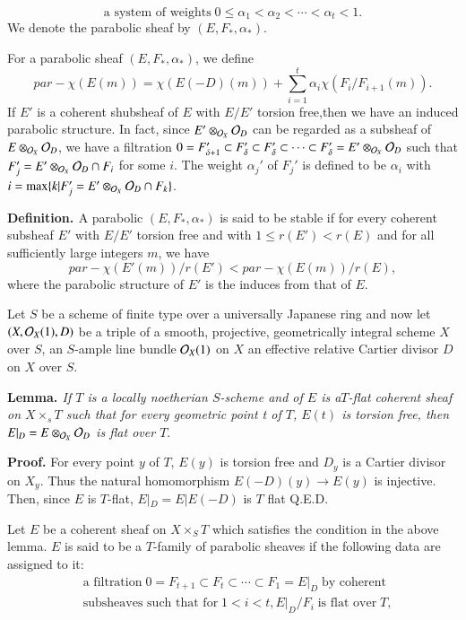 \begin{equation}
\text{a system of weights} \; 0 \leq \alpha_{1} < \alpha_{2} < \cdots < \alpha_{t} < 1.\tag{2.1.2}\label{art12-eq-2.1.2}
\end{equation}
We denote the parabolic sheaf by $(E, F_{*}, \alpha_{*})$.

For a parabolic sheaf $(E, F_{*}, \alpha_{*})$, we define
$$
par-\chi(E(m))= \chi(E(-D)(m)) + \sum\limits_{i=1}^{t} \alpha_{i}\chi(F_{i}/F_{i+1}(m)).
$$ 
If $E'$ is a coherent shubsheaf of $E$ with $E/E'$ torsion free,then we have an induced parabolic structure. In fact, since $E'\otimes_{\mathcal{O}_{X}}\mathcal{O}_{D}$ can be regarded as a subsheaf of $E\otimes_{\mathcal{O}_{X}}\mathcal{O}_{D}$, we have a filtration $0 =F_{\delta+1}' \subset F_{\delta}' \subset F_{\delta}' \subset \cdots\subset F_{\delta}'=E' \otimes_{\mathcal{O}_{X}}\mathcal{O}_{D}$ such that $F_{j}' = E'\otimes_{\mathcal{O}_{X}} \mathcal{O}_{D} \cap F_{i}$ for some $i$. The weight $\alpha_{j}'$ of $F_{j}'$ is defined to be $\alpha_{i}$ with $i=\max\{k | F_{j}' =E'\otimes_{\mathcal{O}_{X}}\mathcal{O}_{D} \cap F_{k}\}$.

\medskip
\noindent
{\bfseries {} Definition. \label{art12-definition-2.2}} A parabolic $(E, F_{*}, \alpha_{*})$ is said to be stable if for every coherent subsheaf $E'$ with $E/E'$ torsion free and with $1 \leq r(E')< r(E)$ and for all sufficiently large integers $m$, we have
$$
par-\chi(E'(m))/r(E') < par-\chi(E(m))/r(E),
$$
where the parabolic structure of $E'$ is the induces from that of $E$.

Let $S$ be a scheme of finite type over a universally Japanese ring and now let $(X, \mathcal{O}_{X}(1),D)$ be a triple of a smooth, projective, geometrically integral scheme $X$ over $S$, an $S$-ample line bundle $\mathcal{O}_{X}(1)$ on $X$ an effective relative Cartier divisor $D$ on $X$ over $S$.

\medskip
\noindent
{\bfseries {} Lemma. \label{art12-Lemma-2.3}} \textit{If $T$ is a locally noetherian $S$-scheme and of $E$ is a$T$-flat coherent sheaf on $X \times_{s}T$ such that for every geometric point t of $T$, $E(t)$ is torsion free, then $E|_{D}=E\otimes_{\mathcal{O}_{X}}\mathcal{O}_{D}$ is flat over $T$}.

\medskip
\noindent
{\bfseries Proof.} For every point $y$ of $T$, $E(y)$ is torsion free and $D_{y}$ is a Cartier divisor on $X_{y}$. Thus the natural homomorphism $E(-D)(y)\rightarrow E(y)$ is injective. Then, since $E$ is $T$-flat, $E|_{D}=E|E(-D)$ is $T$ flat Q.E.D.

Let $E$ be a coherent sheaf on $X \times_{S}T$ which satisfies the condition in the above lemma. $E$ is said to be a $T$-family of parabolic sheaves if the following data are assigned to it:
\begin{align}\label{art12-eq-2.4.1}
 &\text{a filtration}\; 0=F_{t+1}\subset F_{t} \subset \cdots \subset F_{1}= E|_{D}\; \text{by coherent}\tag{2.4.1}\\
  &      \text{subsheaves such that for}\; 1 <i < t, E|_{D}/F_{i}\; \text{is flat over}\; T\nonumber, 
\end{align}

